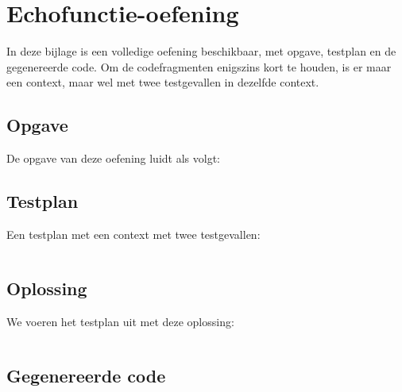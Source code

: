 \chapter{Echofunctie-oefening}\label{ch:echo-function-oefening}

In deze bijlage is een volledige oefening beschikbaar, met opgave, testplan en de gegenereerde code.
Om de codefragmenten enigszins kort te houden, is er maar een context, maar wel met twee testgevallen in dezelfde context.

\section{Opgave}\label{sec:echo-function-opgave}

De opgave van deze oefening luidt als volgt:

\begin{quote}
\end{quote}

\section{Testplan}\label{sec:echo-function-testplan}

Een testplan met een context met twee testgevallen:

\inputminted{json}{sources/echo-function-c/one-testcase.tson}

\section{Oplossing}\label{sec:echo-function-oplossing}

We voeren het testplan uit met deze oplossing:

\inputminted{c}{sources/echo-function-c/correct.c}

\section{Gegenereerde code}\label{sec:echo-function-gegenereerde-code}

